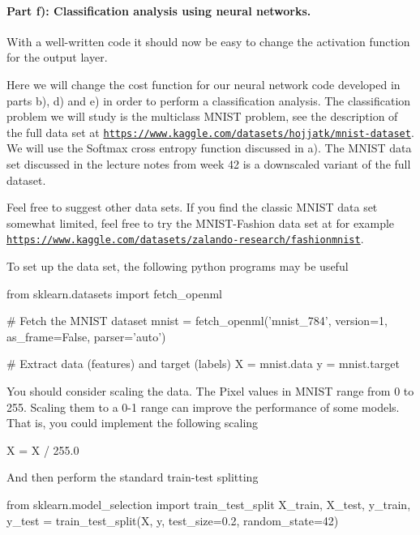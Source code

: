 \documentclass[%
oneside,                 %
final,                   %
10pt]{article}
\begin{document}
\paragraph{Part f): Classification  analysis using neural networks.}
With a well-written code it should now be easy to change the
activation function for the output layer.

Here we will change the cost function for our neural network code
developed in parts b), d) and e) in order to perform a classification
analysis.  The classification problem we will study is the multiclass
MNIST problem, see the description of the full data set at
\href{{https://www.kaggle.com/datasets/hojjatk/mnist-dataset}}{\nolinkurl{https://www.kaggle.com/datasets/hojjatk/mnist-dataset}}. We will use the Softmax cross entropy function discussed in a). 
The MNIST data set discussed in the lecture notes from week 42 is a downscaled variant of the full dataset. 

Feel free to suggest other data sets. If you find the classic MNIST data set somewhat limited, feel free to try the  
MNIST-Fashion data set at for example \href{{https://www.kaggle.com/datasets/zalando-research/fashionmnist}}{\nolinkurl{https://www.kaggle.com/datasets/zalando-research/fashionmnist}}.

To set up the data set, the following python programs may be useful









\bpycod
from sklearn.datasets import fetch_openml

# Fetch the MNIST dataset
mnist = fetch_openml('mnist_784', version=1, as_frame=False, parser='auto')

# Extract data (features) and target (labels)
X = mnist.data
y = mnist.target

\epycod

You should consider scaling the data. The Pixel values in MNIST range from 0 to 255. Scaling them to a 0-1 range can improve the performance of some models. That is, you could implement the following scaling


\bpycod
X = X / 255.0

\epycod

And then perform the standard train-test splitting



\bpycod
from sklearn.model_selection import train_test_split
X_train, X_test, y_train, y_test = train_test_split(X, y, test_size=0.2, random_state=42)
\end{document}
